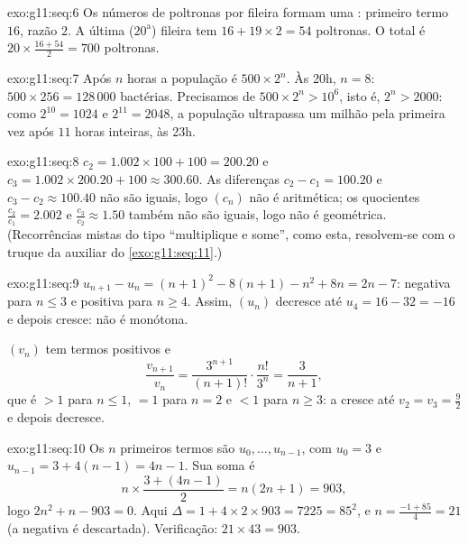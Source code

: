 \begin{solution}{exo:g11:seq:6}
Os números de poltronas por fileira formam uma :
primeiro termo $16$, razão $2$. A última ($20^{\text{a}}$) fileira tem
$16 + 19 \times 2 = 54$ poltronas. O total é
$20 \times \frac{16 + 54}{2} = 700$ poltronas.
\end{solution}

\begin{solution}{exo:g11:seq:7}
Após $n$ horas a população é $500 \times 2^n$. Às 20h, $n = 8$:
$500 \times 256 = 128\,000$ bactérias. Precisamos de
$500 \times 2^n > 10^6$, isto é, $2^n > 2000$: como $2^{10} = 1024$ e
$2^{11} = 2048$, a população ultrapassa um milhão pela primeira vez após
$11$ horas inteiras, às 23h.
\end{solution}

\begin{solution}{exo:g11:seq:8}
$c_2 = 1.002 \times 100 + 100 = 200.20$ e
$c_3 = 1.002 \times 200.20 + 100 \approx 300.60$. As diferenças
$c_2 - c_1 = 100.20$ e $c_3 - c_2 \approx 100.40$ não são iguais, logo
$(c_n)$ não é aritmética; os quocientes $\frac{c_2}{c_1} = 2.002$ e
$\frac{c_3}{c_2} \approx 1.50$ também não são iguais, logo não é
geométrica. (Recorrências mistas do tipo ``multiplique e some'', como
esta, resolvem-se com o truque da  auxiliar do
\cref{exo:g11:seq:11}.)
\end{solution}

\begin{solution}{exo:g11:seq:9}
$u_{n+1} - u_n = (n+1)^2 - 8(n+1) - n^2 + 8n = 2n - 7$: negativa para
$n \leq 3$ e positiva para $n \geq 4$. Assim, $(u_n)$ decresce até
$u_4 = 16 - 32 = -16$ e depois cresce: não é monótona.

$(v_n)$ tem termos positivos e
\[
\frac{v_{n+1}}{v_n} = \frac{3^{n+1}}{(n+1)!} \cdot \frac{n!}{3^n}
= \frac{3}{n+1},
\]
que é $> 1$ para $n \leq 1$, $= 1$ para $n = 2$ e $< 1$ para
$n \geq 3$: a  cresce até $v_2 = v_3 = \frac92$ e depois
decresce.
\end{solution}

\begin{solution}{exo:g11:seq:10}
Os $n$ primeiros termos são $u_0, \dots, u_{n-1}$, com $u_0 = 3$ e
$u_{n-1} = 3 + 4(n-1) = 4n - 1$. Sua soma é
\[
n \times \frac{3 + (4n-1)}{2} = n(2n + 1) = 903,
\]
logo $2n^2 + n - 903 = 0$. Aqui
$\Delta = 1 + 4 \times 2 \times 903 = 7225 = 85^2$, e
$n = \frac{-1 + 85}{4} = 21$ (a  negativa é descartada).
Verificação: $21 \times 43 = 903$.
\end{solution}


